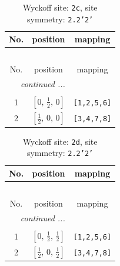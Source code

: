 \documentclass[fleqn,8pt]{jsarticle}
\begin{document}
\renewcommand{\arraystretch}{1.2}
\begin{longtable}{ccc}
\caption{Wyckoff site: {\tt 2c}, site symmetry: {\tt 2.2'2'}}
 \\
 \hline \hline
No. & position & mapping \\ \hline \endfirsthead

\multicolumn{2}{l}{\tablename\ \thetable{}} \\
 \hline \hline
No. & position & mapping \\ \hline \endhead

 \hline \hline
\multicolumn{2}{r}{\footnotesize\it continued ...} \\ \endfoot

 \hline \hline
\multicolumn{2}{r}{} \\ \endlastfoot

1 & $\left[ 0,\, \frac{1}{2},\, 0 \right]$ & {\tt [1,2,5,6]} \\ \hline
2 & $\left[ \frac{1}{2},\, 0,\, 0 \right]$ & {\tt [3,4,7,8]} \\
\end{longtable}
\renewcommand{\arraystretch}{1.2}
\begin{longtable}{ccc}
\caption{Wyckoff site: {\tt 2d}, site symmetry: {\tt 2.2'2'}}
 \\
 \hline \hline
No. & position & mapping \\ \hline \endfirsthead

\multicolumn{2}{l}{\tablename\ \thetable{}} \\
 \hline \hline
No. & position & mapping \\ \hline \endhead

 \hline \hline
\multicolumn{2}{r}{\footnotesize\it continued ...} \\ \endfoot

 \hline \hline
\multicolumn{2}{r}{} \\ \endlastfoot

1 & $\left[ 0,\, \frac{1}{2},\, \frac{1}{2} \right]$ & {\tt [1,2,5,6]} \\ \hline
2 & $\left[ \frac{1}{2},\, 0,\, \frac{1}{2} \right]$ & {\tt [3,4,7,8]} \\
\end{longtable}
\renewcommand{\arraystretch}{1.2}
\end{document}
